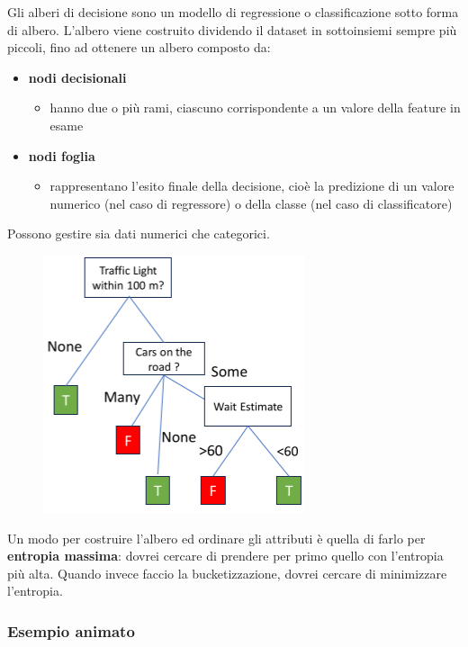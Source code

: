 \documentclass{report}
\begin{document}
Gli alberi di decisione sono un modello di regressione o classificazione sotto forma di albero. L'albero viene costruito dividendo il dataset 
in sottoinsiemi sempre più piccoli, fino ad ottenere un albero composto da:
\begin{itemize}
    \item \textbf{nodi decisionali}
    \begin{itemize}
        \item hanno due o più rami, ciascuno corrispondente a un valore della feature in esame 
    \end{itemize}
    \item \textbf{nodi foglia}
    \begin{itemize}
        \item rappresentano l'esito finale della decisione, cioè la predizione di un valore numerico (nel caso di regressore) o della classe (nel caso 
        di classificatore)
    \end{itemize}
\end{itemize}

\noindent Possono gestire sia dati numerici che categorici.

\begin{figure}[H]
    \centering
    \includegraphics[width=0.6\linewidth]{images/decision-tree.png}
\end{figure}

Un modo per costruire l'albero ed ordinare gli attributi è quella di farlo per \textbf{entropia massima}: dovrei cercare di prendere 
per primo quello con l'entropia più alta. Quando invece faccio la bucketizzazione, dovrei cercare di minimizzare l'entropia.

\subsubsection{Esempio animato}
\end{document}
